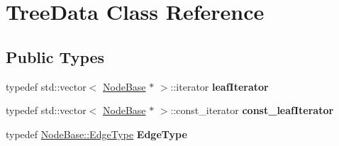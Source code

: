 \hypertarget{classTreeData}{}\section{Tree\+Data Class Reference}
\label{classTreeData}
\subsection*{Public Types}
\begin{DoxyCompactItemize}
\item 
\mbox{\label{classTreeData_a90cd5b202239e3342988e598782abe1a}} 
typedef std\+::vector$<$ \mbox{\hyperlink{classNodeBase}{Node\+Base}} $\ast$ $>$\+::iterator {\bfseries leaf\+Iterator}
\item 
\mbox{\label{classTreeData_a017eb19cf334a058cea1dbb6feb2c3b2}} 
typedef std\+::vector$<$ \mbox{\hyperlink{classNodeBase}{Node\+Base}} $\ast$ $>$\+::const\+\_\+iterator {\bfseries const\+\_\+leaf\+Iterator}
\item 
\mbox{\label{classTreeData_a1c5a361e74df0272dacbe8b9566727c2}} 
typedef \mbox{\hyperlink{classEdge}{Node\+Base\+::\+Edge\+Type}} {\bfseries Edge\+Type}
\end{DoxyCompactItemize}
